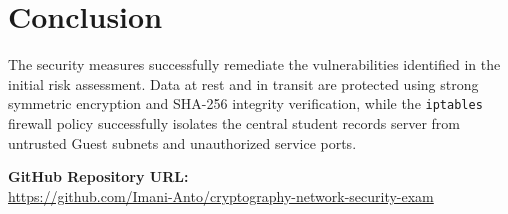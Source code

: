 \documentclass[11pt,a4paper]{article}
\begin{document}
\section{Conclusion}
The security measures successfully remediate the vulnerabilities identified in the initial risk assessment. Data at rest and in transit are protected using strong symmetric encryption and SHA-256 integrity verification, while the \texttt{iptables} firewall policy successfully isolates the central student records server from untrusted Guest subnets and unauthorized service ports.

\vspace{0.5cm}
\noindent\textbf{GitHub Repository URL:} \\
\url{https://github.com/Imani-Anto/cryptography-network-security-exam}
\end{document}
